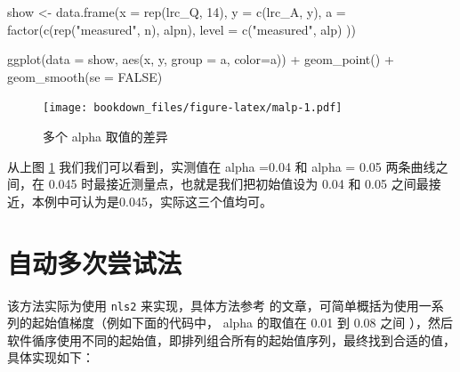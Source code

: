 \documentclass[
]{krantz}
\makeatletter
\newenvironment{Shaded}{\begin{snugshade}}{\end{snugshade}}
\newcommand{\AttributeTok}[1]{\textcolor[rgb]{0.77,0.63,0.00}{#1}}
\newcommand{\ConstantTok}[1]{\textcolor[rgb]{0.00,0.00,0.00}{#1}}
\newcommand{\DecValTok}[1]{\textcolor[rgb]{0.00,0.00,0.81}{#1}}
\newcommand{\FunctionTok}[1]{\textcolor[rgb]{0.00,0.00,0.00}{#1}}
\newcommand{\NormalTok}[1]{#1}
\newcommand{\OtherTok}[1]{\textcolor[rgb]{0.56,0.35,0.01}{#1}}
\newcommand{\SpecialCharTok}[1]{\textcolor[rgb]{0.00,0.00,0.00}{#1}}
\newcommand{\StringTok}[1]{\textcolor[rgb]{0.31,0.60,0.02}{#1}}
\newenvironment{kframe}{%
\medskip{}
\setlength{\fboxsep}{.8em}
 \def\at@end@of@kframe{}%
 \ifinner\ifhmode%
  \def\at@end@of@kframe{\end{minipage}}%
  \begin{minipage}{\columnwidth}%
 \fi\fi%
 \def\FrameCommand##1{\hskip\@totalleftmargin \hskip-\fboxsep
 \colorbox{shadecolor}{##1}\hskip-\fboxsep
     \hskip-\linewidth \hskip-\@totalleftmargin \hskip\columnwidth}%
 \MakeFramed {\advance\hsize-\width
   \@totalleftmargin\z@ \linewidth\hsize
   \@setminipage}}%
 {\par\unskip\endMakeFramed%
 \at@end@of@kframe}
\renewenvironment{Shaded}{\begin{kframe}}{\end{kframe}}
\makeatother
\begin{document}
\begin{Shaded}
\begin{Highlighting}[]
\NormalTok{show }\OtherTok{\textless{}{-}} \FunctionTok{data.frame}\NormalTok{(}\AttributeTok{x =} \FunctionTok{rep}\NormalTok{(lrc\_Q, }\DecValTok{14}\NormalTok{),}
           \AttributeTok{y =} \FunctionTok{c}\NormalTok{(lrc\_A, y), }
           \AttributeTok{a =} \FunctionTok{factor}\NormalTok{(}\FunctionTok{c}\NormalTok{(}\FunctionTok{rep}\NormalTok{(}\StringTok{"measured"}\NormalTok{, n), alpn),}
           \AttributeTok{level =} \FunctionTok{c}\NormalTok{(}\StringTok{"measured"}\NormalTok{, alp)}
\NormalTok{             ))}

\FunctionTok{ggplot}\NormalTok{(}\AttributeTok{data =}\NormalTok{ show, }\FunctionTok{aes}\NormalTok{(x, y, }\AttributeTok{group =}\NormalTok{ a, }\AttributeTok{color=}\NormalTok{a)) }\SpecialCharTok{+} 
  \FunctionTok{geom\_point}\NormalTok{() }\SpecialCharTok{+} 
  \FunctionTok{geom\_smooth}\NormalTok{(}\AttributeTok{se =} \ConstantTok{FALSE}\NormalTok{) }
\end{Highlighting}
\end{Shaded}

\begin{figure}
\centering
\texttt{[image: bookdown\_files/figure-latex/malp-1.pdf]}
\caption{\label{fig:malp}多个 alpha 取值的差异}
\end{figure}

从上图 \ref{fig:malp} 我们我们可以看到，实测值在 alpha =0.04 和 alpha = 0.05 两条曲线之间，在 0.045 时最接近测量点，也就是我们把初始值设为 0.04 和 0.05 之间最接近，本例中可认为是0.045，实际这三个值均可。

\hypertarget{mult_try}{%
\section{自动多次尝试法}\label{mult_try}}

该方法实际为使用 \texttt{nls2} 来实现，具体方法参考 \citet{nls2} 的文章，可简单概括为使用一系列的起始值梯度（例如下面的代码中， alpha 的取值在 0.01 到 0.08 之间 ），然后软件循序使用不同的起始值，即排列组合所有的起始值序列，最终找到合适的值，具体实现如下：
\end{document}
